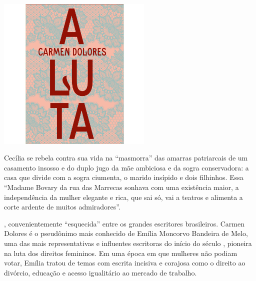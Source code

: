 \vfill

\hspace*{-.4cm}\begin{minipage}[c]{.5\linewidth}
\small{
{}}
\end{minipage}

\pagebreak %


\begin{center}
\hspace*{.5cm}\includegraphics[width=74mm]{./grid/luta.jpg}
\end{center}

\hspace*{-7cm}\hrulefill\hspace*{-7cm}

\medskip

\noindent{}Cecília se rebela contra sua vida na “masmorra” das amarras patriarcais de um casamento insosso e do duplo jugo da mãe ambiciosa e da sogra conservadora: a casa que divide com a sogra ciumenta, o marido insípido e dois filhinhos. Essa “Madame Bovary da rua das Marrecas sonhava com uma existência maior, a independência da mulher elegante e rica, que sai só, vai a teatros e alimenta a corte ardente de muitos admiradores”.

, convenientemente “esquecida” entre os grandes escritores brasileiros. Carmen Dolores é o pseudônimo mais conhecido de Emília Moncorvo Bandeira de Melo, uma das mais representativas e influentes escritoras do início do século , pioneira na luta dos direitos femininos. Em uma época em que mulheres não podiam votar, Emília tratou de temas com escrita incisiva e corajosa como o direito ao divórcio, educação e acesso igualitário ao mercado de trabalho. 


